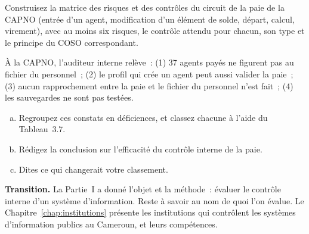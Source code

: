 \begin{boxexo}[title={\ding{45}\quad Exercice~3.3. Une matrice pour la paie \niveaumoyen}]
Construisez la matrice des risques et des contrôles du circuit de la paie
de la CAPNO (entrée d'un agent, modification d'un élément de solde,
départ, calcul, virement), avec au moins six risques, le contrôle attendu
pour chacun, son type et le principe du COSO correspondant.
\end{boxexo}

\begin{boxexo}[title={\ding{45}\quad Exercice~3.4. Classer et conclure \niveauexpert}]
À la CAPNO, l'auditeur interne relève~: (1) 37 agents payés ne figurent
pas au fichier du personnel~; (2) le profil qui crée un agent peut aussi
valider la paie~; (3) aucun rapprochement entre la paie et le fichier du
personnel n'est fait~; (4) les sauvegardes ne sont pas testées.
\begin{enumerate}[(a)]
    \item Regroupez ces constats en déficiences, et classez chacune à
          l'aide du Tableau~3.7.
    \item Rédigez la conclusion sur l'efficacité du contrôle interne de la
          paie.
    \item Dites ce qui changerait votre classement.
\end{enumerate}
\end{boxexo}

\begin{boxinfo}
\textbf{Transition.} La Partie~I a donné l'objet et la méthode~:
évaluer le contrôle interne d'un système d'information. Reste à savoir au
nom de quoi l'on évalue. Le Chapitre~\ref{chap:institutions} présente les
institutions qui contrôlent les systèmes d'information publics au
Cameroun, et leurs compétences.
\end{boxinfo}
